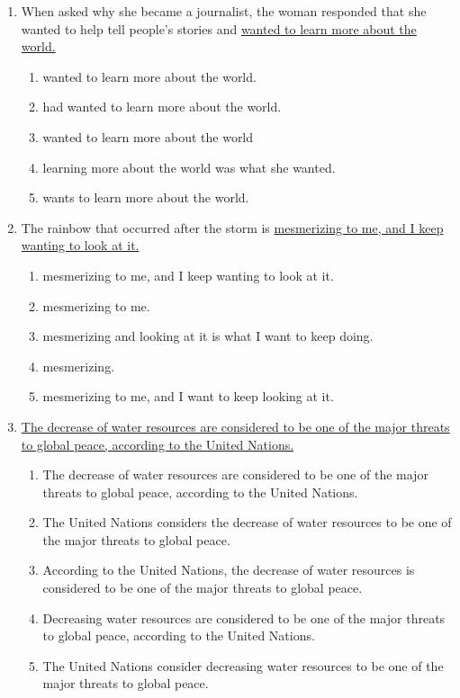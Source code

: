 \begin{enumerate}
\item When asked why she became a journalist, the woman responded that she wanted to help tell people’s stories and \ul{wanted to learn more about the world.}

\bigskip
\begin{enumerate}[label=(\Alph*)]
\item wanted to learn more about the world.
\item had wanted to learn more about the world. 
\item wanted to learn more about the world
\item learning more about the world was what she wanted. 
\item wants to learn more about the world. 
\end{enumerate}

\item The rainbow that occurred after the storm is \ul{mesmerizing to me, and I keep wanting to look at it.}

\bigskip
\begin{enumerate}[label=(\Alph*)]
\item mesmerizing to me, and I keep wanting to look at it.
\item mesmerizing to me. 
\item mesmerizing and looking at it is what I want to keep doing. 
\item mesmerizing. 
\item mesmerizing to me, and I want to keep looking at it.
\end{enumerate}

\item \ul{The decrease of water resources are considered to be one of the major threats to global peace, according to the United Nations.} 

\bigskip
\begin{enumerate}[label=(\Alph*)]
\item The decrease of water resources are considered to be one of the major threats to global peace, according to the United Nations.
\item The United Nations considers the decrease of water resources to be one of the major threats to global peace.
\item According to the United Nations, the decrease of water resources is considered to be one of the major threats to global peace.
\item Decreasing water resources are considered to be one of the major threats to global peace, according to the United Nations.
\item The United Nations consider decreasing water resources to be one of the major threats to global peace.
\end{enumerate}


\end{enumerate}
